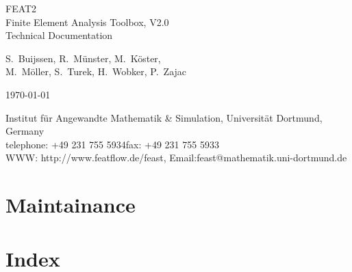 \documentclass[10pt,a4paper]{report}
\begin{document}
\begin{titlepage}

\vspace*{4cm}

\begin{center}

{\Huge FEAT2}\\[2cm] 
{\huge Finite Element Analysis Toolbox, V2.0}\\[0.5cm] 

{\LARGE Technical Documentation}\\[3cm]

\vspace*{0.5cm}

{\large
 S.~Buijssen, R.~M\"unster, M.~K\"oster, \\[1em]
 M.~M\"oller, S.~Turek, H.~Wobker, P.~Zajac}

\vspace*{2cm}

\today

\vspace*{2cm}

Institut f{\"u}r Angewandte Mathematik \& Simulation, Universit{\"a}t Dortmund, Germany \\[0.5em]
telephone: +49 231 755 5934\qquad fax: +49 231 755 5933 \\[0.5em]
WWW: http://www.featflow.de/feast, Email:feast@mathematik.uni-dortmund.de

\end{center}

\end{titlepage}

%
\tableofcontents


\chapter{Maintainance}





%


%

%

%
\nocite{Turek1997c,Turek1998}


%
\chapter*{Index}
\end{document}
